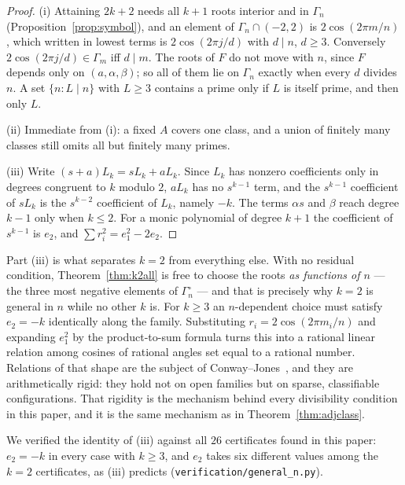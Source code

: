 \documentclass[11pt]{article}
\theoremstyle{definition}
\begin{document}
\begin{proof}
(i) Attaining $2k+2$ needs all $k+1$ roots interior and in $\Gamma_n$
(Proposition~\ref{prop:symbol}), and an element of $\Gamma_n\cap(-2,2)$ is
$2\cos(2\pi m/n)$, which written in lowest terms is $2\cos(2\pi j/d)$ with
$d\mid n$, $d\ge3$. Conversely $2\cos(2\pi j/d)\in\Gamma_m$ iff $d\mid m$. The
roots of $F$ do not move with $n$, since $F$ depends only on
$(a,\alpha,\beta)$; so all of them lie on $\Gamma_n$ exactly when every $d$
divides $n$. A set $\{n:L\mid n\}$ with $L\ge3$ contains a prime only if $L$ is
itself prime, and then only $L$.

(ii) Immediate from (i): a fixed $A$ covers one class, and a union of finitely
many classes still omits all but finitely many primes.

(iii) Write $(s+a)L_k=sL_k+aL_k$. Since $L_k$ has nonzero coefficients only in
degrees congruent to $k$ modulo $2$, $aL_k$ has no $s^{k-1}$ term, and the
$s^{k-1}$ coefficient of $sL_k$ is the $s^{k-2}$ coefficient of $L_k$, namely
$-k$. The terms $\alpha s$ and $\beta$ reach degree $k-1$ only when $k\le2$.
For a monic polynomial of degree $k+1$ the coefficient of $s^{k-1}$ is $e_2$,
and $\sum r_i^{2}=e_1^{2}-2e_2$.
\end{proof}

\noindent
Part (iii) is what separates $k=2$ from everything else. With no residual
condition, Theorem~\ref{thm:k2all} is free to choose the roots
\emph{as functions of $n$} --- the three most negative elements of
$\Gamma^{\circ}_n$ --- and that is precisely why $k=2$ is general in $n$ while
no other $k$ is. For $k\ge3$ an $n$-dependent choice must satisfy
$e_2=-k$ identically along the family. Substituting
$r_i=2\cos(2\pi m_i/n)$ and expanding $e_1^{2}$ by the product-to-sum formula
turns this into a rational linear relation among cosines of rational angles set
equal to a rational number. Relations of that shape are the subject of
Conway--Jones~\cite{cj76}, and they are arithmetically rigid: they hold not on
open families but on sparse, classifiable configurations. That rigidity is the
mechanism behind every divisibility condition in this paper, and it is the same
mechanism as in Theorem~\ref{thm:adjclass}.

We verified the identity of (iii) against all $26$ certificates found in this
paper: $e_2=-k$ in every case with $k\ge3$, and $e_2$ takes six different
values among the $k=2$ certificates, as (iii) predicts
(\texttt{verification/general\_n.py}).
\end{document}
